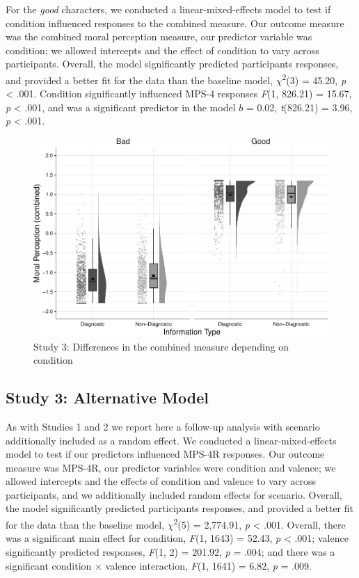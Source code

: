 \documentclass[
  man,floatsintext]{apa6}
\begin{document}
For the \emph{good} characters, we conducted a linear-mixed-effects model to test if condition influenced responses to the combined measure. Our outcome measure was the combined moral perception measure, our predictor variable was condition; we allowed intercepts and the effect of condition to vary across participants. Overall, the model significantly predicted participants responses, and provided a better fit for the data than the baseline model, \(\chi\)\textsuperscript{2}(3) = 45.20, \emph{p} \textless{} .001. Condition significantly influenced MPS-4 responses \emph{F}(1, 826.21) = 15.67, \emph{p} \textless{} .001, and was a significant predictor in the model \(b\) = 0.02, \emph{t}(826.21) = 3.96, \emph{p} \textless{} .001.

\begin{figure}[!h]
\includegraphics[width=\textwidth,]{Supplementary_files/figure-latex/S3combinedplot-1} \caption{Study 3: Differences in the combined measure depending on condition}\label{fig:S3combinedplot}
\end{figure}

\newpage

\subsection{Study 3: Alternative Model}\label{study-3-alternative-model}

As with Studies 1 and 2 we report here a follow-up analysis with scenario additionally included as a random effect. We conducted a linear-mixed-effects model to test if our predictors influenced MPS-4R responses. Our outcome measure was MPS-4R, our predictor variables were condition and valence; we allowed intercepts and the effects of condition and valence to vary across participants, and we additionally included random effects for scenario.
Overall, the model significantly predicted participants responses, and provided a better fit for the data than the baseline model,
\(\chi\)\textsuperscript{2}(5) = 2,774.91, \emph{p} \textless{} .001.
Overall, there was a significant main effect for condition,
\emph{F}(1, 1643) = 52.43, \emph{p} \textless{} .001;
valence significantly predicted responses,
\emph{F}(1, 2) = 201.92, \emph{p} = .004;
and there was a significant condition \(\times\) valence interaction,
\emph{F}(1, 1641) = 6.82, \emph{p} = .009.
\end{document}

